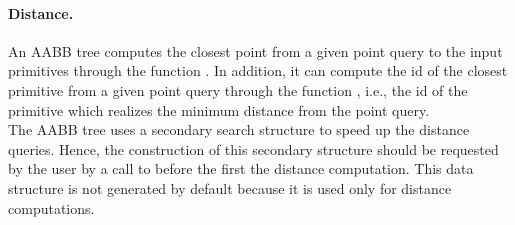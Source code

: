 \paragraph{Distance.} An AABB tree computes the closest point from a given point query to the input primitives through the function . In addition, it can compute the id of the closest primitive from a given point query through the function , i.e., the id of the primitive which realizes the minimum distance from the point query.\\ 

The AABB tree uses a secondary search structure to speed up the distance queries. Hence, the construction of this secondary structure should be requested by the user by a call to  before the first the distance computation. This data structure is not generated by default because it is used only for distance computations.





